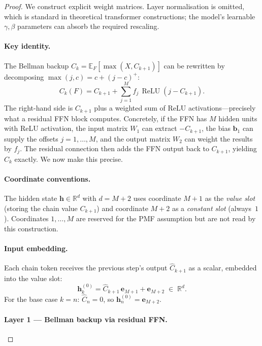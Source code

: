 \begin{proof}
We construct explicit weight matrices. Layer normalisation is omitted, which is standard in theoretical transformer constructions; the model's learnable $\gamma, \beta$ parameters can absorb the required rescaling.

\paragraph{Key identity.}
The Bellman backup $C_k = \mathbb{E}_F[\max(X, C_{k+1})]$ can be rewritten by decomposing $\max(j, c) = c + (j - c)^+$:
\begin{equation}
\label{eq:bellman-relu}
C_k(F) = C_{k+1} + \sum_{j=1}^{M} f_j \,\operatorname{ReLU}(j - C_{k+1}).
\end{equation}
The right-hand side is $C_{k+1}$ plus a weighted sum of ReLU activations---precisely what a residual FFN block computes. Concretely, if the FFN has $M$ hidden units with ReLU activation, the input matrix $W_1$ can extract $-C_{k+1}$, the bias $\mathbf{b}_1$ can supply the offsets $j = 1,\ldots,M$, and the output matrix $W_2$ can weight the results by $f_j$. The residual connection then adds the FFN output back to $C_{k+1}$, yielding $C_k$ exactly. We now make this precise.

\paragraph{Coordinate conventions.}
The hidden state $\mathbf{h} \in \mathbb{R}^d$ with $d = M + 2$ uses coordinate $M{+}1$ as the \emph{value slot} (storing the chain value $C_{k+1}$) and coordinate $M{+}2$ as a \emph{constant slot} (always~$1$). Coordinates $1,\ldots,M$ are reserved for the PMF assumption but are not read by this construction.

\paragraph{Input embedding.}
Each chain token receives the previous step's output $\hat C_{k+1}$ as a scalar, embedded into the value slot:
\[
\mathbf{h}_k^{(0)} = \hat C_{k+1}\,\mathbf{e}_{M+1} + \mathbf{e}_{M+2} \;\in\;\mathbb{R}^d.
\]
For the base case $k = n$: $\hat C_n = 0$, so $\mathbf{h}_n^{(0)} = \mathbf{e}_{M+2}$.

\paragraph{Layer 1 --- Bellman backup via residual FFN.}


\end{proof}
